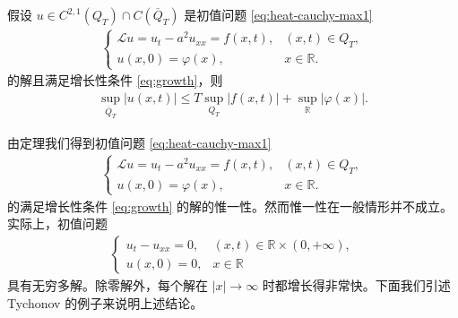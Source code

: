 \documentclass[../../main.tex]{subfiles}%
\begin{document}
\begin{theorem}
假设 $u\in C^{2,1}(Q_T)\cap C(\overline{Q}_T)$ 是初值问题 \eqref{eq:heat-cauchy-max1}
\begin{align}
\begin{cases}
\mathcal{L}u=u_t-a^2u_{xx}=f(x,t), & (x,t)\in Q_T,\\
u(x,0)=\varphi(x), & x\in\mathbb{R}.
\end{cases} \label{eq:heat-cauchy-max1}
\end{align}
的解且满足增长性条件 \eqref{eq:growth}，则
\begin{align*}
\sup_{\overline{Q}_T}|u(x,t)|\leqslant T\sup_{Q_T}|f(x,t)|+\sup_{\mathbb{R}}|\varphi(x)|.
\end{align*}
\end{theorem}
\begin{remark}
由定理我们得到初值问题 \eqref{eq:heat-cauchy-max1}
\begin{align*}
\begin{cases}
\mathcal{L}u=u_t-a^2u_{xx}=f(x,t), & (x,t)\in Q_T,\\
u(x,0)=\varphi(x), & x\in\mathbb{R}.
\end{cases}
\end{align*}
的满足增长性条件 \eqref{eq:growth} 的解的惟一性。然而惟一性在一般情形并不成立。实际上，初值问题
\begin{align*}
\begin{cases}
u_t-u_{xx}=0, & (x,t)\in\mathbb{R}\times(0,+\infty),\\
u(x,0)=0, & x\in\mathbb{R}
\end{cases}
\end{align*}
具有无穷多解。除零解外，每个解在 $|x|\to\infty$ 时都增长得非常快。下面我们引述 Tychonov 的例子来说明上述结论。


\end{remark}
\end{document}
